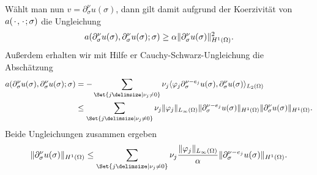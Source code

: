 \begin{Satz}
\begin{Beweis}
        Wählt man nun $v = \partial^{\nu}_{\sigma} u(\sigma)$, dann gilt damit aufgrund der Koerzivität von $a({\mkern2mu\cdot\mkern2mu}, {\mkern2mu\cdot\mkern2mu}; \sigma)$ die Ungleichung
        \begin{equation}
            a(\partial^{\nu}_{\sigma} u(\sigma), \partial^{\nu}_{\sigma} u(\sigma); \sigma) \geq \alpha \lVert\partial^{\nu}_{\sigma} u(\sigma)\rVert_{H^{1}(\Omega)}^{2}.
        \end{equation}
        Außerdem erhalten wir mit Hilfe er Cauchy-Schwarz-Ungleichung die Abschätzung
        \begin{align}
            a(\partial^{\nu}_{\sigma} u(\sigma), \partial^{\nu}_{\sigma} u(\sigma); \sigma)
            &= - \sum_{\Set{j \given \nu_{j} \neq 0}} \nu_{j} \skp{\varphi_{j} \partial^{\nu - e_{j}}_{\sigma} u(\sigma) }{\partial^{\nu}_{\sigma} u(\sigma)}{L_{2}(\Omega)}
            \\&\leq \sum_{\Set{j \given \nu_{j} \neq 0}} \nu_{j} \norm{\varphi_{j}}_{L_{\infty}(\Omega)} \norm{\partial^{\nu - e_{j}}_{\sigma} u(\sigma)}_{H^{1}(\Omega)} \norm{\partial^{\nu}_{\sigma} u(\sigma)}_{H^{1}(\Omega)}.
        \end{align}
        Beide Ungleichungen zusammen ergeben
        \begin{equation}
            \norm{\partial^{\nu}_{\sigma} u(\sigma)}_{H^{1}(\Omega)} \leq \sum_{\Set{j \given \nu_{j} \neq 0}} \nu_{j} \frac{\norm{\varphi_{j}}_{L_{\infty}(\Omega)}}{\alpha} \norm{\partial^{\nu - e_{j}}_{\sigma} u(\sigma)}_{H^{1}(\Omega)}.
        \end{equation}


\end{Beweis}
\end{Satz}
